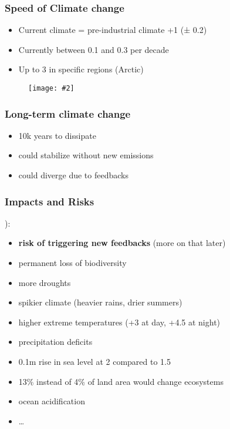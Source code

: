 \documentclass[10pt]{beamer}
\newcommand{\imgtw}[2][1]{%
  \begin{figure}%
    \centering%
    \texttt{[image: \#2]}%
  \end{figure}%
}
\begin{document}
\begin{frame}
  \frametitle{Speed of Climate change}
  \begin{itemize}[<+->]
  \item Current climate = pre-industrial climate +1\celsius{} (±
    0.2\celsius)
  \item Currently between 0.1\celsius{} and 0.3\celsius{} per decade
  \item Up to 3\celsius{} in specific regions (Arctic)
  \end{itemize}
\end{frame}

\begin{frame}[standout]
  \imgtw{ipcc-warming}
\end{frame}

\begin{frame}
  \frametitle{Long-term climate change}

  \begin{itemize}[<+->]
  \item 10k years to dissipate \CO
  \item could stabilize without new emissions
  \item could diverge due to feedbacks
  \end{itemize}
\end{frame}

\begin{frame}
  \frametitle{Impacts and Risks}
  ):
  \begin{itemize}[<+->]
  \item \textbf{risk of triggering new feedbacks} (more on that later)
  \item permanent loss of biodiversity
  \item more droughts
  \item spikier climate (heavier rains, drier summers)
  \item higher extreme temperatures (+3\celsius{} at day,
    +4.5\celsius{} at night)
  \item precipitation deficits
  \item 0.1m rise in sea level at 2\celsius{} compared to 1.5\celsius
  \item 13\% instead of 4\% of land area would change ecosystems
  \item ocean acidification
  \item …
  \end{itemize}
\end{frame}
\end{document}
